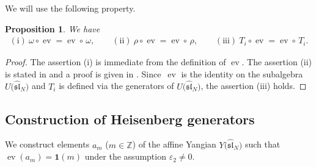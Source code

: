 \documentclass[10pt,a4paper]{amsart}
\newtheorem{prop}[thm]{Proposition}
\theoremstyle{definition}
\numberwithin{equation}{section}
\DeclareMathOperator{\ev}{ev}
\newcommand{\ve}{\varepsilon}
\newcommand{\bbZ}{\mathbb{Z}}
\newcommand{\affY}{Y\big(\affsl\big)}
\newcommand{\affsl}{\hat{\mathfrak{sl}}_N}
\newcommand{\bfid}{\mathbf{1}}
\begin{document}
We will use the following property.
\begin{prop}\label{prop:ev_and_auto}We have
\begin{gather*}
\mathrm{(i)}\ \omega \circ \ev = \ev \circ \,\omega, \qquad \mathrm{(ii)}\ \rho \circ \ev = \ev \circ\, \rho,\qquad \mathrm{(iii)}\ T_i \circ \ev = \ev \circ\, T_i.
\end{gather*}
\end{prop}
\begin{proof}The assertion (i) is immediate from the definition of $\ev$. The assertion (ii) is stated in \cite[Section~6, p.~463]{MR2323534} and a proof is given in \cite[Proposition~3.6]{kodera_evaluation}. Since~$\ev$ is the identity on the subalgebra $U\big(\affsl\big)$ and $T_i$ is defined via the generators of $U\big(\affsl\big)$, the assertion (iii) holds.
\end{proof}


\subsection{Construction of Heisenberg generators}

We construct elements $a_m$ ($m \in \bbZ$) of the affine Yangian $\affY$ such that $\ev(a_m) = \bfid(m)$ under the assumption $\ve_2 \neq 0$.
\end{document}
